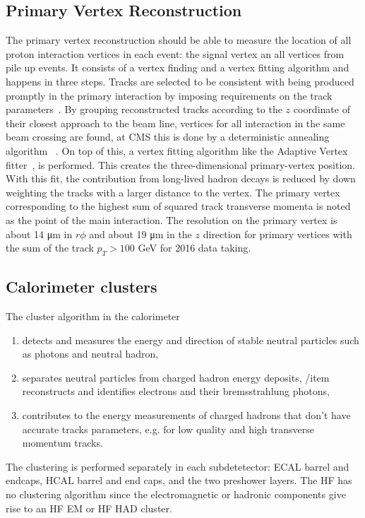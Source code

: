 \subsection{Primary Vertex Reconstruction}
The primary vertex reconstruction should be able to measure the location of all proton interaction vertices in each event: the signal vertex an all vertices from pile up events. 
It consists of a vertex finding and a vertex fitting algorithm and happens in three steps. Tracks are selected  to be consistent with being produced promptly in the primary interaction by imposing requirements on the track parameters~\cite{Chatrchyan:1704291}. By grouping reconstructed tracks according to the $z$ coordinate of their closest approach to the beam line, vertices for all interaction in the same beam crossing are found, at CMS this is done by a deterministic annealing algorithm~\cite{726788} . On top of this, a vertex fitting algorithm like the Adaptive Vertex fitter~\cite{Waltenberger:1166320}, is performed. This creates the three-dimensional primary-vertex position. With this fit, the contribution from long-lived hadron decays is reduced by down weighting the tracks with a larger distance to the vertex. The primary vertex corresponding to the highest sum of squared track transverse momenta is noted as the point of the main interaction. The resolution on the primary vertex is about 14 \si{ \micro \meter} in $r\phi$ and about 19 \si{ \micro \meter} in the $z$ direction for primary vertices with the sum of the track $p_T > 100$ \si{ \GeV} for 2016 data taking.

\subsection{Calorimeter clusters}
The cluster algorithm in the calorimeter 
\begin{enumerate}
	\item detects and measures the energy and direction of stable neutral particles such as photons and neutral hadron, 
	\item separates neutral particles from charged hadron energy deposits, 
	/item reconstructs and identifies electrons and their bremsstrahlung photons, 
	\item contributes to the energy measurements of charged hadrons that don't have accurate tracks parameters, e.g. for low quality and high transverse momentum tracks. 
\end{enumerate}
The clustering is performed separately in each subdetetector: ECAL barrel and endcaps, HCAL barrel and end caps, and the two preshower layers. The HF has no clustering algorithm since the electromagnetic or hadronic components give rise to an HF EM or HF HAD cluster. 

